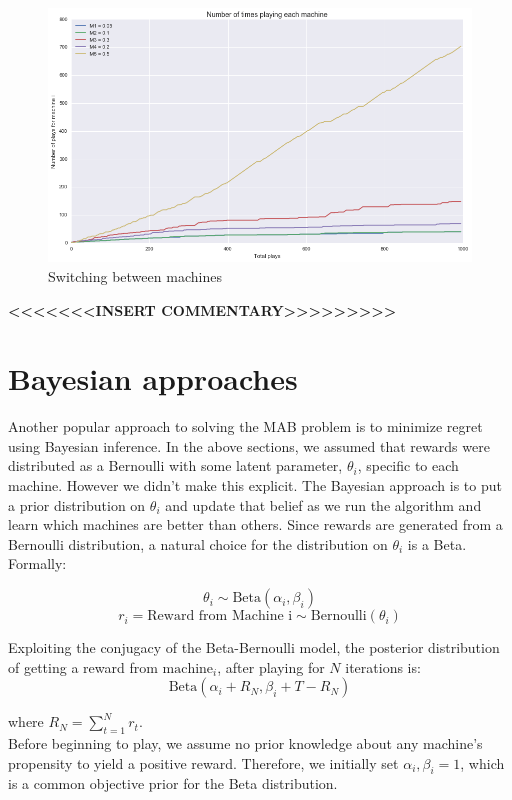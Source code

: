 \documentclass{article}
\begin{document}
\begin{figure}[H]
\centering
\includegraphics[scale=0.5]{UCB_num_plays.png}
\caption{Switching between machines}
\end{figure}

\textbf{<<<<<<<INSERT COMMENTARY>>>>>>>>>}

\section{Bayesian approaches}

Another popular approach to solving the MAB problem is to minimize regret using Bayesian inference. In the above sections, we assumed that rewards were distributed as a Bernoulli with some latent parameter, $\theta_i$, specific to each machine. However we didn't make this explicit. The Bayesian approach is to put a prior distribution on $\theta_i$ and update that belief as we run the algorithm and learn which machines are better than others. Since rewards are generated from a Bernoulli distribution, a natural choice for the distribution on $\theta_i$ is a Beta. Formally:

$$\theta_i \sim \text{Beta}(\alpha_i, \beta_i)$$
$$r_i = \text{Reward from Machine i} \sim \text{Bernoulli}(\theta_i)$$

Exploiting the conjugacy of the Beta-Bernoulli model, the posterior distribution of getting a reward from $\text{machine}_i$, after playing for $N$ iterations is:
$$\text{Beta}(\alpha_i + R_{N}, \beta_i + T - R_{N})$$

where $R_{N} = \sum_{t=1}^{N}r_{t}$.\\

Before beginning to play, we assume no prior knowledge about any machine's propensity to yield a positive reward. Therefore, we initially set $\alpha_i, \beta_i = 1$, which is a common objective prior for the Beta distribution.\\
\end{document}
